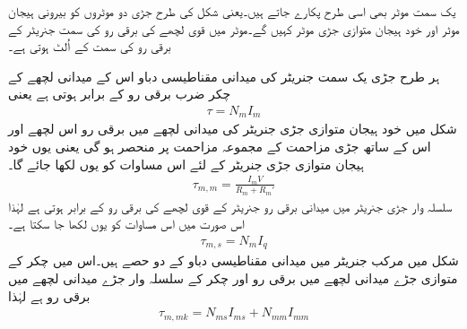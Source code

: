 یک سمت  موٹر بھی اسی طرح پکارے جاتے ہیں۔یعنی شکل   کی طرح جڑی دو موٹروں کو بیرونی ہیجان موٹر اور خود ہیجان متوازی جڑی موٹر کہیں گے۔موٹر میں قوی لچھے کی برقی رو کی سمت جنریٹر کے برقی رو کی سمت کے اُلٹ ہوتی ہے۔

ہر طرح جڑی یک سمت  جنریٹر کی میدانی مقناطیسی دباو اس کے میدانی لچھے کے چکر ضرب برقی رو کے برابر ہوتی ہے یعنی
\begin{align}
\tau=N_m I_m
\end{align}
شکل   میں خود ہیجان متوازی جڑی جنریٹر کی میدانی لچھے میں برقی رو اس لچھے اور اس کے ساتھ جڑی مزاحمت کے مجموعہ  مزاحمت  پر منحصر ہو گی یعنی  یوں خود ہیجان متوازی جڑی جنریٹر کے لئے اس مساوات کو یوں لکھا جائے گا۔
\begin{align}
\tau_{m,m}=\frac{I_m V}{R_m+R_m'}
\end{align}
سلسلہ وار جڑی جنریٹر میں میدانی برقی رو جنریٹر کے قوی لچھے کی برقی رو کے برابر ہوتی ہے لہٰذا اس صورت میں اس مساوات کو یوں لکھا جا سکتا ہے۔
\begin{align}
\tau_{m,s}=N_m I_q
\end{align}
شکل   میں مرکب جنریٹر میں میدانی مقناطیسی دباو کے دو حصے ہیں۔اس میں  چکر کے متوازی جڑے میدانی لچھے میں برقی رو   اور   چکر کے سلسلہ وار جڑے میدانی لچھے میں  برقی رو  ہے لہٰذا
\begin{align}
\tau_{m,mk}=N_{ms} I_{ms}+N_{mm} I_{mm}
\end{align}

